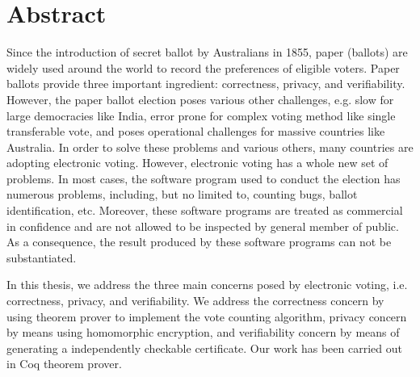 \chapter*{Abstract}
\vspace{-1em}


Since the introduction of secret ballot by Australians in 1855, 
paper (ballots) are widely used around the world to record 
the preferences of eligible voters. Paper ballots provide three 
important ingredient: correctness, privacy, and verifiability. 
However, the paper ballot election poses various  other challenges, e.g. 
slow for large democracies like India,  error prone for complex voting method 
like single transferable vote, and poses operational challenges for 
massive countries like Australia. In order to solve these problems and various others, 
many countries are adopting electronic voting. However, 
electronic voting has a whole new set of problems. In most cases, the software 
program used to conduct the election has numerous problems, including, but no limited to, 
counting bugs, ballot identification, etc. Moreover, 
these software programs are treated as commercial in confidence and 
are not allowed to be inspected by general member of public. 
As a consequence, the result produced by these software programs 
can not be substantiated.

In this thesis, we address the three main concerns posed by electronic voting, i.e. 
correctness, privacy, and verifiability. We address the correctness concern by using 
theorem prover to implement the vote counting algorithm, 
privacy concern by means using homomorphic encryption, and verifiability concern 
by means of generating a independently checkable certificate.  Our work 
has been carried out in Coq theorem prover.

